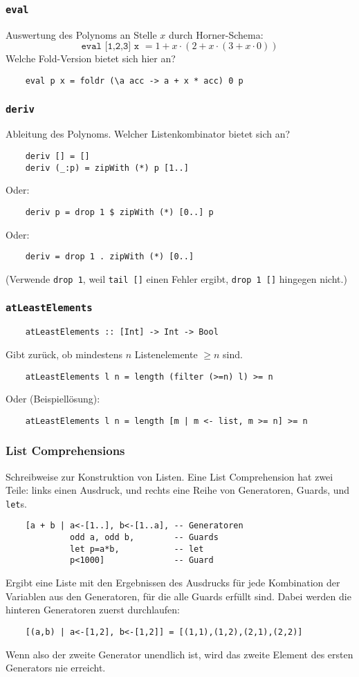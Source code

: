 \documentclass{beamer}
\begin{document}
\begin{frame}[fragile]
  \frametitle{\lstinline{eval}}
  Auswertung des Polynoms an Stelle $x$ durch Horner-Schema:
  \[\texttt{eval [1,2,3] x }= 1 + x\cdot(2 + x\cdot(3 + x\cdot0))\]
  Welche Fold-Version bietet sich hier an?
  \pause
  \begin{lstlisting}
    eval p x = foldr (\a acc -> a + x * acc) 0 p
  \end{lstlisting}
\end{frame}

\begin{frame}[fragile]
  \frametitle{\lstinline{deriv}}
  Ableitung des Polynoms. Welcher Listenkombinator bietet sich an?
  \pause
  \begin{lstlisting}
    deriv [] = []
    deriv (_:p) = zipWith (*) p [1..]
  \end{lstlisting}
  Oder:
  \begin{lstlisting}
    deriv p = drop 1 $ zipWith (*) [0..] p
  \end{lstlisting}
  Oder:
  \begin{lstlisting}
    deriv = drop 1 . zipWith (*) [0..]
  \end{lstlisting}
  (Verwende \lstinline{drop 1}, weil \lstinline{tail []} einen Fehler ergibt, \lstinline{drop 1 []} hingegen nicht.)
\end{frame}

\begin{frame}[fragile]
  \frametitle{\lstinline{atLeastElements}}
  \begin{lstlisting}
    atLeastElements :: [Int] -> Int -> Bool
  \end{lstlisting}
  Gibt zurück, ob mindestens $n$ Listenelemente $\geq n$ sind.
  \pause
  \begin{lstlisting}
    atLeastElements l n = length (filter (>=n) l) >= n
  \end{lstlisting}
  Oder (Beispiellösung):
  \begin{lstlisting}
    atLeastElements l n = length [m | m <- list, m >= n] >= n
  \end{lstlisting}
\end{frame}

\begin{frame}[fragile]
  \frametitle{List Comprehensions}
  Schreibweise zur Konstruktion von Listen.
  Eine List Comprehension hat zwei Teile:
  links einen Ausdruck,
  und rechts eine Reihe von Generatoren, Guards, und \texttt{let}s.
  \begin{lstlisting}
    [a + b | a<-[1..], b<-[1..a], -- Generatoren
             odd a, odd b,        -- Guards
             let p=a*b,           -- let
             p<1000]              -- Guard
  \end{lstlisting}
  Ergibt eine Liste mit den Ergebnissen des Ausdrucks für jede Kombination der Variablen aus den Generatoren, für die alle Guards erfüllt sind.
  Dabei werden die hinteren Generatoren zuerst durchlaufen:
  \begin{lstlisting}
    [(a,b) | a<-[1,2], b<-[1,2]] = [(1,1),(1,2),(2,1),(2,2)]
  \end{lstlisting}
  Wenn also der zweite Generator unendlich ist, wird das zweite Element des ersten Generators nie erreicht.
\end{frame}
\end{document}
